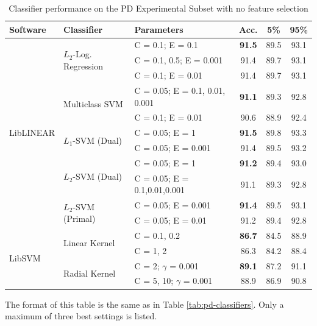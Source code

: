 \documentclass[12pt,notitlepage]{report}
\begin{document}
\begin{table}[htpb]
\caption{Classifier performance on the PD Experimental Subset with no feature selection}\label{tab:pd-allfeat}\footnotesize
\begin{center}
\begin{tabular}{|l|l|l|c|c|c|}\hline
\bf Software & \bf Classifier & \bf Parameters & \bf Acc. & \bf 5\% & \bf 95\% \\\hline
\multirow{11}{*}{LibLINEAR} & \multirow{3}{*}{$L_2$-Log. Regression} & C = 0.1; E = 0.1 & \bf 91.5 & 89.5 & 93.1 \\
 & & C = 0.1, 0.5; E = 0.001 & 91.4 & 89.7 & 93.1 \\
 & & C = 0.1; E = 0.01 & 91.4 & 89.7 & 93.1 \\\cline{2-6}
 & \multirow{2}{*}{Multiclass SVM} & C = 0.05; E = 0.1, 0.01, 0.001 & \bf 91.1 & 89.3 & 92.8 \\ 
 &  & C = 0.1; E = 0.01 & 90.6 & 88.9 & 92.4 \\\cline{2-6}
 & \multirow{2}{*}{$L_1$-SVM (Dual)} & C = 0.05; E = 1 & \bf 91.5 & 89.8 & 93.3 \\
 & & C = 0.05; E = 0.001 & 91.4 & 89.5 & 93.2 \\ \cline{2-6}
 & \multirow{2}{*}{$L_2$-SVM (Dual)} & C = 0.05; E = 1 & \bf 91.2 & 89.4 & 93.0 \\
 &  & C = 0.05; E = 0.1,0.01,0.001 & 91.1 & 89.3 & 92.8 \\\cline{2-6}
 & \multirow{2}{*}{$L_2$-SVM (Primal)} & C = 0.05; E = 0.001 & \bf 91.4 & 89.5 & 93.1 \\
 &  & C = 0.05; E = 0.01 & 91.2 & 89.4 & 92.8  \\\hline
 \multirow{4}{*}{LibSVM} & \multirow{2}{*}{Linear Kernel} & C = 0.1, 0.2 & \bf 86.7 & 84.5 & 88.9  \\
 &  & C = 1, 2 & 86.3 & 84.2 & 88.4 \\\cline{2-6}
 & \multirow{2}{*}{Radial Kernel} & C = 2; $\gamma$ = 0.001 & \bf 89.1 & 87.2 & 91.1 \\
 &  & C = 5, 10; $\gamma$ = 0.001 & 88.9 & 86.9 & 90.8 \\\hline
\end{tabular}
\end{center}
The format of this table is the same as in Table \ref{tab:pd-classifiers}. Only a maximum of three best settings is listed.
\end{table}
\end{document}
